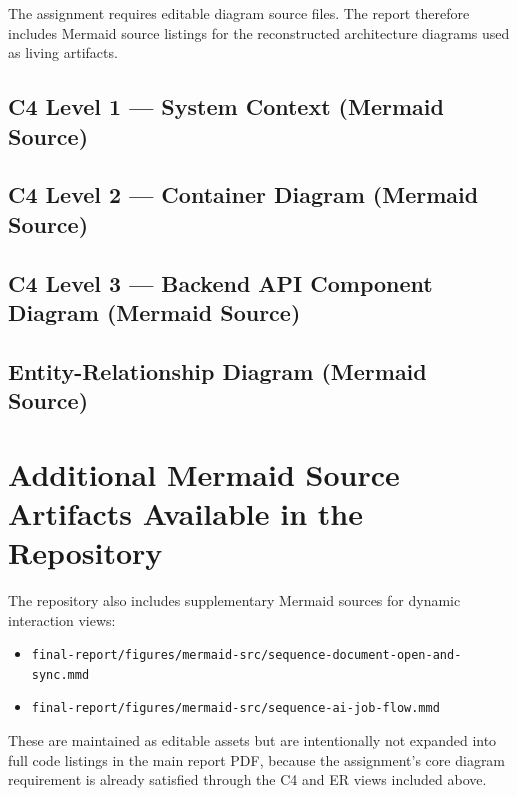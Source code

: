 The assignment requires editable diagram source files. The report therefore includes Mermaid source
listings for the reconstructed architecture diagrams used as living artifacts.

\subsection{C4 Level 1 --- System Context (Mermaid Source)}


\subsection{C4 Level 2 --- Container Diagram (Mermaid Source)}


\subsection{C4 Level 3 --- Backend API Component Diagram (Mermaid Source)}


\subsection{Entity-Relationship Diagram (Mermaid Source)}


\section{Additional Mermaid Source Artifacts Available in the Repository}

The repository also includes supplementary Mermaid sources for dynamic interaction views:

\begin{itemize}
  \item \texttt{final-report/figures/mermaid-src/sequence-document-open-and-sync.mmd}
  \item \texttt{final-report/figures/mermaid-src/sequence-ai-job-flow.mmd}
\end{itemize}

These are maintained as editable assets but are intentionally not expanded into full code listings in the
main report PDF, because the assignment's core diagram requirement is already satisfied through the C4
and ER views included above.
